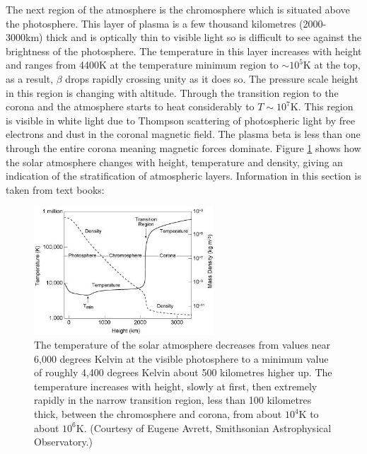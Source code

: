 The next region of the atmosphere is the chromosphere which is situated above the photosphere. This layer of plasma is a few thousand kilometres (2000-3000km) thick and is optically thin to visible light so is difficult to see against the brightness of the photosphere. The temperature in this layer increases with height and ranges from 4400K at the temperature minimum region to $\sim10^{5}$K at the top, as a result, $\beta$ drops rapidly crossing unity as it does so. The pressure scale height in this region is changing with altitude. Through the transition region to the corona and the atmosphere starts to heat considerably to $T\sim10^{7}$K. This region is visible in white light due to Thompson scattering of photospheric light by free electrons and dust in the coronal magnetic field. The plasma beta is less than one through the entire corona meaning magnetic forces dominate. Figure \ref{solatm} shows how the solar atmosphere changes with height, temperature and density, giving an indication of the stratification of atmospheric layers. Information in this section is taken from text books: \cite{2003dysu.book.....D, 2004soas.book.....F}

\begin{figure}[H]
  \begin{center}
    \includegraphics[width=0.6\textwidth]{solar-atm-plot}
\caption{The temperature of the solar atmosphere decreases from values near 6,000 degrees Kelvin at the visible photosphere to a minimum value of roughly 4,400 degrees Kelvin about 500 kilometres higher up. The temperature increases with height, slowly at first, then extremely rapidly in the narrow transition region, less than 100 kilometres thick, between the chromosphere and corona, from about $10^{4}$K to about $10^{6}$K. (Courtesy of Eugene Avrett, Smithsonian Astrophysical Observatory.)}\label{solatm}
  \end{center}
\end{figure}

  
